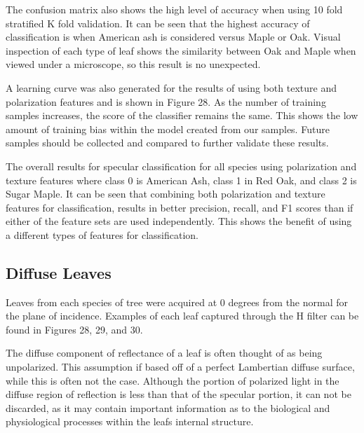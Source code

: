 The confusion matrix also shows the high level of accuracy when using 10 fold stratified K fold validation.  It can be seen that the highest accuracy of classification is when American ash is considered versus Maple or Oak.  Visual inspection of each type of leaf shows the similarity between Oak and Maple when viewed under a microscope, so this result is no unexpected.

A learning curve was also generated for the results of using both texture and polarization features and is shown in Figure 28.  As the number of training samples increases, the score of the classifier remains the same.  This shows the low amount of training bias within the model created from our samples. Future samples should be collected and compared to further validate these results.
%
\begin{center}
\end{center}
%
%
\begin{center}
\end{center}
%
The overall results for specular classification for all species using polarization and texture features where class 0 is American Ash, class 1 in Red Oak, and class 2 is Sugar Maple.
It can be seen that combining both polarization and texture features for classification, results in better precision, recall, and F1 scores than if either of the feature sets are used independently.  This shows the benefit of using a different types of features for classification.

\subsection{Diffuse Leaves}
Leaves from each species of tree were acquired at 0 degrees from the normal for the plane of incidence.  Examples of each leaf captured through the H filter can be found in Figures 28, 29, and 30.

The diffuse component of reflectance of a leaf is often thought of as being unpolarized.  This assumption if based off of a perfect Lambertian diffuse surface, while this is often not the case.  Although the portion of polarized light in the diffuse region of reflection is less than that of the specular portion, it can not be discarded, as it may contain important information as to the biological and physiological processes within the leafs internal structure.

